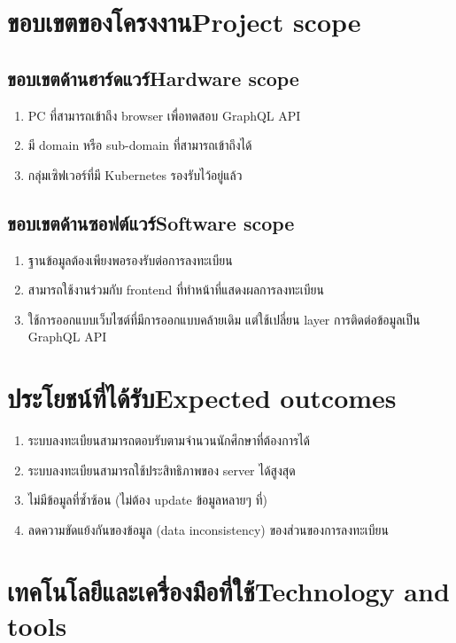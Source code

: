 \section{\ifcpe ขอบเขตของโครงงาน\else Project scope\fi}

\subsection{\ifcpe ขอบเขตด้านฮาร์ดแวร์\else Hardware scope\fi}
\begin{enumerate}
    \item PC ที่สามารถเข้าถึง browser เพื่อทดสอบ GraphQL API
    \item มี domain หรือ sub-domain ที่สามารถเข้าถึงได้
    \item กลุ่มเซิฟเวอร์ที่มี Kubernetes รองรับไว้อยู่แล้ว
\end{enumerate}
\subsection{\ifcpe ขอบเขตด้านซอฟต์แวร์\else Software scope\fi}
\begin{enumerate}
    \item ฐานข้อมูลต้องเพียงพอรองรับต่อการลงทะเบียน
    \item สามารถใช้งานร่วมกับ frontend ที่ทำหน้าที่แสดงผลการลงทะเบียน
    \item ใช้การออกแบบเว็บไซต์ที่มีการออกแบบคล้ายเดิม แต่ใช้เปลี่ยน layer การติดต่อข้อมูลเป็น GraphQL API \cite{graphql}
\end{enumerate}
\section{\ifcpe ประโยชน์ที่ได้รับ\else Expected outcomes\fi}
\begin{enumerate}
    \item ระบบลงทะเบียนสามารถตอบรับตามจำนวนนักศึกษาที่ต้องการได้
    \item ระบบลงทะเบียนสามารถใช้ประสิทธิภาพของ server ได้สูงสุด
    \item ไม่มีข้อมูลที่ซ้ำซ้อน (ไม่ต้อง update ข้อมูลหลายๆ ที่)
    \item ลดความขัดแย้งกันของข้อมูล (data inconsistency) ของส่วนของการลงทะเบียน
\end{enumerate}

\section{\ifcpe เทคโนโลยีและเครื่องมือที่ใช้\else Technology and tools\fi}

